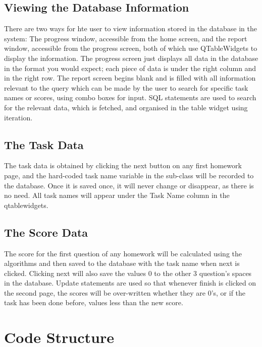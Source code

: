 \subsection{Viewing the Database Information}

There are two ways for hte user to view information stored in the database in the system: The progress window, accessible from the home screen, and the report window, accessible from the progress screen, both of which use QTableWidgets to display the information. The progress screen just displays all data in the database in the format you would expect; each piece of data is under the right column and in the right row. The report screen begins blank and is filled with all information relevant to the query which can be made by the user to search for specific task names or scores, using combo boxes for input. SQL statements are used to search for the relevant data, which is fetched, and organised in the table widget using iteration.

\subsection{The Task Data}

The task data is obtained by clicking the next button on any first homework page, and the hard-coded task name variable in the sub-class will be recorded to the database. Once it is saved once, it will never change or disappear, as there is no need. All task names will appear under the Task Name column in the qtablewidgets.

\subsection{The Score Data}

The score for the first question of any homework will be calculated using the algorithms and then saved to the database with the task name when next is clicked. Clicking next will also save the values 0 to the other 3 question's spaces in the database. Update statements are used so that whenever finish is clicked on the second page, the scores will be over-written whether they are 0's, or if the task has been done before, values less than the new score.

\section{Code Structure}


